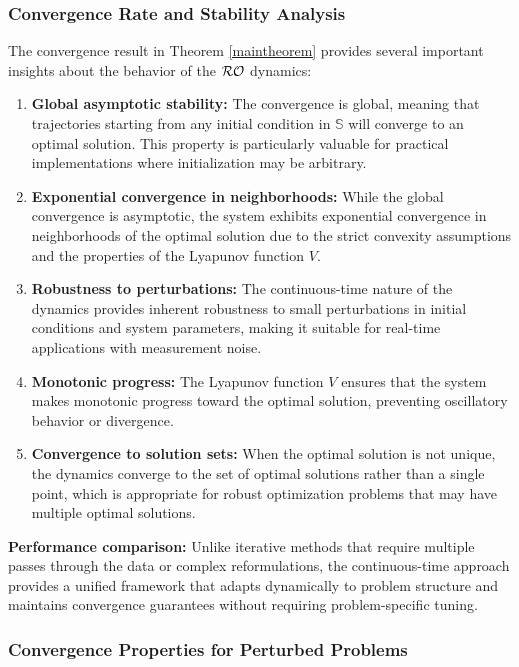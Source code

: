 \documentclass[journal,twoside,web]{ieeecolor}
\begin{document}
{\color{blue} \subsubsection{Convergence Rate and Stability Analysis}

The convergence result in Theorem \ref{maintheorem} provides several important insights about the behavior of the ${\cal RO}$ dynamics:

\begin{enumerate}
\item \textbf{Global asymptotic stability:} The convergence is global, meaning that trajectories starting from any initial condition in $\mathbb{S}$ will converge to an optimal solution. This property is particularly valuable for practical implementations where initialization may be arbitrary.

\item \textbf{Exponential convergence in neighborhoods:} While the global convergence is asymptotic, the system exhibits exponential convergence in neighborhoods of the optimal solution due to the strict convexity assumptions and the properties of the Lyapunov function $V$.

\item \textbf{Robustness to perturbations:} The continuous-time nature of the dynamics provides inherent robustness to small perturbations in initial conditions and system parameters, making it suitable for real-time applications with measurement noise.

\item \textbf{Monotonic progress:} The Lyapunov function $V$ ensures that the system makes monotonic progress toward the optimal solution, preventing oscillatory behavior or divergence.

\item \textbf{Convergence to solution sets:} When the optimal solution is not unique, the dynamics converge to the set of optimal solutions rather than a single point, which is appropriate for robust optimization problems that may have multiple optimal solutions.
\end{enumerate}

\textbf{Performance comparison:} Unlike iterative methods that require multiple passes through the data or complex reformulations, the continuous-time approach provides a unified framework that adapts dynamically to problem structure and maintains convergence guarantees without requiring problem-specific tuning.

\subsubsection{Convergence Properties for Perturbed Problems}

}
\end{document}
